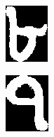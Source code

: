 \begin{figure}
\begin{subfigure}{0.09\textwidth}
\end{subfigure}
\begin{subfigure}{0.09\textwidth}
    \centering
    \includegraphics[width=0.9\linewidth]{./img/experiment/stage.17/05-01-00-good}
\end{subfigure}
\begin{subfigure}{0.09\textwidth}
    \centering
    \includegraphics[width=0.9\linewidth]{./img/experiment/stage.17/06-01-00-good}

\end{subfigure}
\end{figure}
